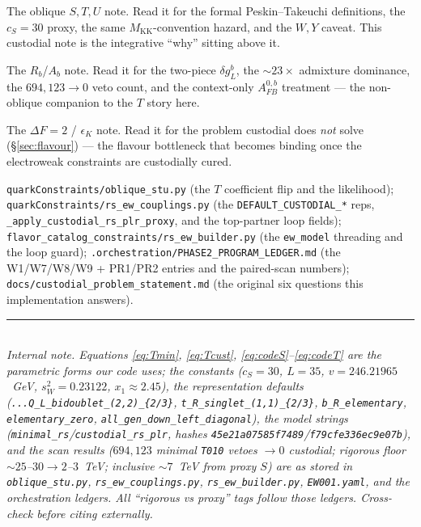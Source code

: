 \documentclass[11pt]{article}
\newcommand{\MKK}{M_{\mathrm{KK}}}
\newcommand{\swsq}{s_W^2}
\newcommand{\vev}{v}
\newcommand{\code}[1]{\texttt{#1}}
\newcommand{\dgL}{\delta g_L^b}
\newcommand{\Afb}{A_{FB}^{0,b}}
\theoremstyle{definition}
\begin{document}
\begin{description}[leftmargin=0em,style=nextline]
\item[Our \code{stu\_review.tex}.] The oblique $S,T,U$ note. Read it for the
formal Peskin--Takeuchi definitions, the $c_S=30$ proxy, the same $\MKK$-convention
hazard, and the $W,Y$ caveat. This custodial note is the integrative ``why''
sitting above it.

\item[Our \code{z\_to\_bb\_review.tex}.] The $R_b$/$A_b$ note. Read it for the
two-piece $\dgL$, the $\sim 23\times$ admixture dominance, the $694{,}123\to0$
veto count, and the context-only $\Afb$ treatment --- the non-oblique companion to
the $T$ story here.

\item[Our \code{rs\_flavor\_anarchy\_review.tex}.] The $\Delta F=2$ /
$\epsilon_K$ note. Read it for the problem custodial does \emph{not} solve
(\S\ref{sec:flavour}) --- the flavour bottleneck that becomes binding once the
electroweak constraints are custodially cured.

\item[Repo files to read in order.] \code{quarkConstraints/oblique\_stu.py}
(the $T$ coefficient flip and the likelihood);
\code{quarkConstraints/rs\_ew\_couplings.py} (the
\code{DEFAULT\_CUSTODIAL\_*} reps, \code{\_apply\_custodial\_rs\_plr\_proxy}, and
the top-partner loop fields); \code{flavor\_catalog\_constraints/rs\_ew\_builder.py}
(the \code{ew\_model} threading and the loop guard);
\code{.orchestration/PHASE2\_PROGRAM\_LEDGER.md} (the W1/W7/W8/W9 + PR1/PR2
entries and the paired-scan numbers); \code{docs/custodial\_problem\_statement.md}
(the original six questions this implementation answers).
\end{description}

\bigskip
\noindent\rule{\linewidth}{0.4pt}\\
\footnotesize
\emph{Internal note. Equations \eqref{eq:Tmin}, \eqref{eq:Tcust},
\eqref{eq:codeS}--\eqref{eq:codeT} are the parametric forms our code uses; the
constants ($c_S=30$, $L=35$, $\vev=246.21965$~GeV, $\swsq=0.23122$,
$x_1\approx2.45$), the representation defaults
(\code{...Q\_L\_bidoublet\_(2,2)\_\{2/3\}}, \code{t\_R\_singlet\_(1,1)\_\{2/3\}},
\code{b\_R\_elementary}, \code{elementary\_zero},
\code{all\_gen\_down\_left\_diagonal}), the model strings
(\code{minimal\_rs}/\code{custodial\_rs\_plr}, hashes
\code{45e21a07585f7489}/\code{f79cfe336ec9e07b}), and the scan results
($694{,}123$ minimal \code{T010} vetoes $\to 0$ custodial; rigorous floor
$\sim25$--$30\to2$--$3$~TeV; inclusive $\sim7$~TeV from proxy $S$) are as stored
in \code{oblique\_stu.py}, \code{rs\_ew\_couplings.py}, \code{rs\_ew\_builder.py},
\code{EW001.yaml}, and the orchestration ledgers. All ``rigorous vs proxy'' tags
follow those ledgers. Cross-check before citing externally.}
\end{document}
